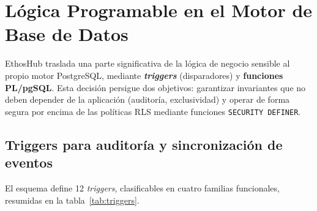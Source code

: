 \section{Lógica Programable en el Motor de Base de Datos}
\label{sec:programable}

EthosHub traslada una parte significativa de la lógica de negocio sensible al propio
motor PostgreSQL, mediante \textbf{\textit{triggers}} (disparadores) y
\textbf{funciones PL/pgSQL}. Esta decisión persigue dos objetivos: garantizar
invariantes que no deben depender de la aplicación (auditoría, exclusividad) y operar de
forma segura por encima de las políticas RLS mediante funciones \texttt{SECURITY DEFINER}.

\subsection{Triggers para auditoría y sincronización de eventos}
\label{subsec:triggers}

El esquema define 12 \textit{triggers}, clasificables en cuatro familias funcionales,
resumidas en la tabla~\ref{tab:triggers}.

